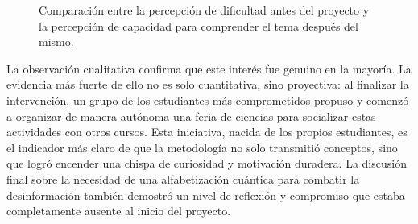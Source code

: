 \documentclass[10pt,a4paper]{article}
\begin{document}
\begin{figure}[h!]
    \centering
    \caption{Comparación entre la percepción de dificultad antes del proyecto y la percepción de capacidad para comprender el tema después del mismo.}
    \label{fig:eficacia_comparativo}
\end{figure}




La observación cualitativa confirma que este interés fue genuino en la mayoría. La evidencia más fuerte de ello no es solo cuantitativa, sino proyectiva: al finalizar la intervención, un grupo de los estudiantes más comprometidos propuso y comenzó a organizar de manera autónoma una feria de ciencias para socializar estas actividades con otros cursos. Esta iniciativa, nacida de los propios estudiantes, es el indicador más claro de que la metodología no solo transmitió conceptos, sino que logró encender una chispa de curiosidad y motivación duradera. La discusión final sobre la necesidad de una alfabetización cuántica para combatir la desinformación también demostró un nivel de reflexión y compromiso que estaba completamente ausente al inicio del proyecto.
\end{document}
